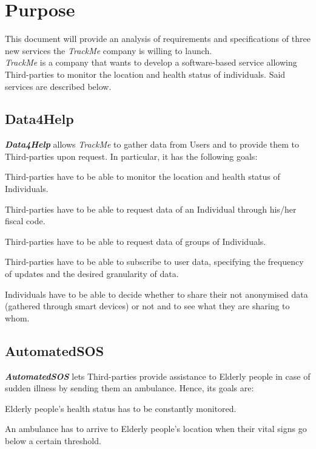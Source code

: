 \section{Purpose}
    This document will provide an analysis of requirements and specifications of three new services the \emph{TrackMe} company is willing to launch.\\
    \emph{TrackMe} is a company that wants to develop a software-based service allowing Third-parties to monitor the location and health status of individuals.
    Said services are described below.

\subsection{Data4Help}
    \textbf{\emph{Data4Help}} allows \emph{TrackMe} to gather data from Users and to provide them to Third-parties upon request. In particular, it has the following goals:
    \begin{enumerate}[label={[}G1.\arabic*{]}]
        \item \label{goal1 : monitoring} Third-parties have to be able to monitor the location and health status of Individuals.
        \item \label{goal1 : individual monitoring}Third-parties have to be able to request data of an Individual through his/her fiscal code.
        \item \label{goal1 : group monitoring} Third-parties have to be able to request data of groups of Individuals.
        \item \label{goal1 : subscription} Third-parties have to be able to subscribe to user data, specifying the frequency of updates and the desired granularity of data.
        \item \label{goal1: individual privacy} Individuals have to be able to decide whether to share their not anonymised data (gathered through smart devices) or not and to see what they are sharing to whom.
    \end{enumerate}

\subsection{AutomatedSOS}    
    \textbf{\emph{AutomatedSOS}} lets Third-parties provide assistance to Elderly people in case of sudden illness by sending them an ambulance. Hence, its goals are:
    \begin{enumerate}[label={[}G2.\arabic*{]}]
        \item \label{goal2 : status monitorin} Elderly people's health status has to be constantly monitored.
        \item \label{goal2 : ambulance} An ambulance has to arrive to Elderly people's location when their vital signs go below a certain threshold.
    \end{enumerate}
    
